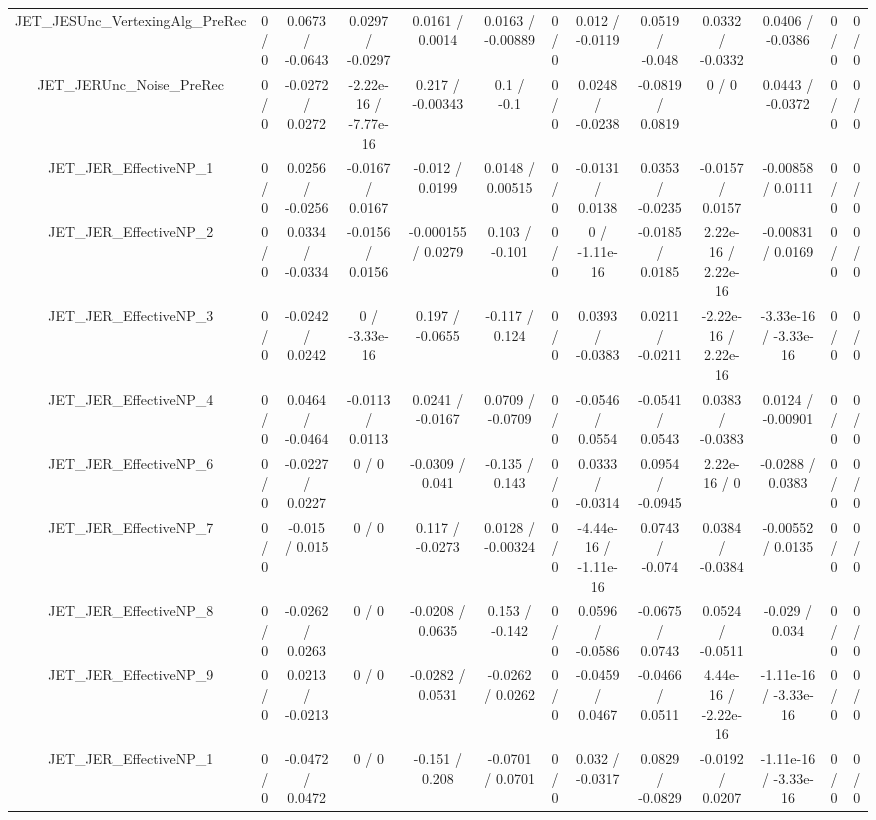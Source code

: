 \documentclass[10pt]{article}
\begin{document}
\begin{table}[htbp]
\begin{center}
\begin{tabular}{|c|c|c|c|c|c|c|c|c|c|c|c|c|}
  JET_JESUnc_VertexingAlg_PreRec & 0 / 0 & 0.0673 / -0.0643 & 0.0297 / -0.0297 & 0.0161 / 0.0014 & 0.0163 / -0.00889 & 0 / 0 & 0.012 / -0.0119 & 0.0519 / -0.048 & 0.0332 / -0.0332 & 0.0406 / -0.0386 & 0 / 0 & 0 / 0 \\ 
  JET_JERUnc_Noise_PreRec & 0 / 0 & -0.0272 / 0.0272 & -2.22e-16 / -7.77e-16 & 0.217 / -0.00343 & 0.1 / -0.1 & 0 / 0 & 0.0248 / -0.0238 & -0.0819 / 0.0819 & 0 / 0 & 0.0443 / -0.0372 & 0 / 0 & 0 / 0 \\ 
  JET_JER_EffectiveNP_1 & 0 / 0 & 0.0256 / -0.0256 & -0.0167 / 0.0167 & -0.012 / 0.0199 & 0.0148 / 0.00515 & 0 / 0 & -0.0131 / 0.0138 & 0.0353 / -0.0235 & -0.0157 / 0.0157 & -0.00858 / 0.0111 & 0 / 0 & 0 / 0 \\ 
  JET_JER_EffectiveNP_2 & 0 / 0 & 0.0334 / -0.0334 & -0.0156 / 0.0156 & -0.000155 / 0.0279 & 0.103 / -0.101 & 0 / 0 & 0 / -1.11e-16 & -0.0185 / 0.0185 & 2.22e-16 / 2.22e-16 & -0.00831 / 0.0169 & 0 / 0 & 0 / 0 \\ 
  JET_JER_EffectiveNP_3 & 0 / 0 & -0.0242 / 0.0242 & 0 / -3.33e-16 & 0.197 / -0.0655 & -0.117 / 0.124 & 0 / 0 & 0.0393 / -0.0383 & 0.0211 / -0.0211 & -2.22e-16 / 2.22e-16 & -3.33e-16 / -3.33e-16 & 0 / 0 & 0 / 0 \\ 
  JET_JER_EffectiveNP_4 & 0 / 0 & 0.0464 / -0.0464 & -0.0113 / 0.0113 & 0.0241 / -0.0167 & 0.0709 / -0.0709 & 0 / 0 & -0.0546 / 0.0554 & -0.0541 / 0.0543 & 0.0383 / -0.0383 & 0.0124 / -0.00901 & 0 / 0 & 0 / 0 \\ 
  JET_JER_EffectiveNP_6 & 0 / 0 & -0.0227 / 0.0227 & 0 / 0 & -0.0309 / 0.041 & -0.135 / 0.143 & 0 / 0 & 0.0333 / -0.0314 & 0.0954 / -0.0945 & 2.22e-16 / 0 & -0.0288 / 0.0383 & 0 / 0 & 0 / 0 \\ 
  JET_JER_EffectiveNP_7 & 0 / 0 & -0.015 / 0.015 & 0 / 0 & 0.117 / -0.0273 & 0.0128 / -0.00324 & 0 / 0 & -4.44e-16 / -1.11e-16 & 0.0743 / -0.074 & 0.0384 / -0.0384 & -0.00552 / 0.0135 & 0 / 0 & 0 / 0 \\ 
  JET_JER_EffectiveNP_8 & 0 / 0 & -0.0262 / 0.0263 & 0 / 0 & -0.0208 / 0.0635 & 0.153 / -0.142 & 0 / 0 & 0.0596 / -0.0586 & -0.0675 / 0.0743 & 0.0524 / -0.0511 & -0.029 / 0.034 & 0 / 0 & 0 / 0 \\ 
  JET_JER_EffectiveNP_9 & 0 / 0 & 0.0213 / -0.0213 & 0 / 0 & -0.0282 / 0.0531 & -0.0262 / 0.0262 & 0 / 0 & -0.0459 / 0.0467 & -0.0466 / 0.0511 & 4.44e-16 / -2.22e-16 & -1.11e-16 / -3.33e-16 & 0 / 0 & 0 / 0 \\ 
  JET_JER_EffectiveNP_1 & 0 / 0 & -0.0472 / 0.0472 & 0 / 0 & -0.151 / 0.208 & -0.0701 / 0.0701 & 0 / 0 & 0.032 / -0.0317 & 0.0829 / -0.0829 & -0.0192 / 0.0207 & -1.11e-16 / -3.33e-16 & 0 / 0 & 0 / 0 \\ 

\end{tabular}
\end{center}
\end{table}
\end{document}
